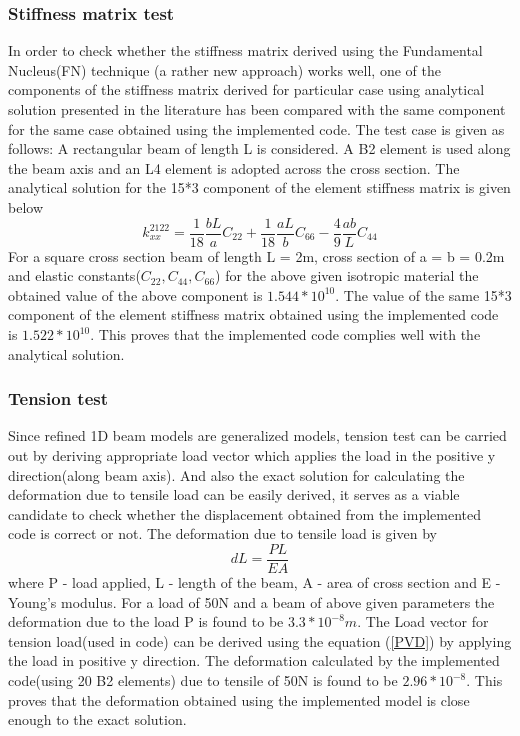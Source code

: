 \documentclass[a4paper,12pt]{article}
\begin{document}
\subsubsection*{Stiffness matrix test}
\indent\indent\indent\indent In order to check whether the stiffness matrix derived using the Fundamental Nucleus(FN) technique (a rather new approach) works well, one of the components of the stiffness matrix derived for particular case using analytical solution presented in the literature has been compared with the same component for the same case obtained using the implemented code. The test case is given as follows: A rectangular beam of length L is considered. A B2 element is used along the beam axis and an L4 element is adopted across the cross section. The analytical solution for the 15*3 component of the element stiffness matrix is given below
\begin{equation}
k^{2122}_{xx} = \frac{1}{18} \frac{b L}{a} C_{22} + \frac{1}{18} \frac{a L}{b} C_{66} - \frac{4}{9} \frac{a b}{L} C_{44}
\end{equation}
For a square cross section beam of length L = 2m, cross section of a = b = 0.2m and elastic constants($C_{22},C_{44},C_{66}$) for the above given isotropic material the obtained value of the above component is $1.544*10^{10}$. The value of the same 15*3 component of the element stiffness matrix obtained using the implemented code is $1.522*10^{10}$. This proves that the implemented code complies well with the analytical solution.
\subsubsection*{Tension test}
\indent\indent\indent\indent Since refined 1D beam models are generalized models, tension test can be carried out by deriving appropriate load vector which applies the load in the positive y direction(along beam axis). And also the exact solution for calculating the deformation due to tensile load can be easily derived, it serves as a viable candidate to check whether the displacement obtained from the implemented code is correct or not. The deformation due to tensile load is given by 
\begin{equation}
dL = \frac{P L}{E A}
\label{exactdef}
\end{equation}
where P - load applied, L - length of the beam, A - area of cross section and E - Young's modulus. For a load of 50N and a beam of above given parameters the deformation due to the load P is found to be $3.3*10^{-8}m$. The Load vector for tension load(used in code) can be derived using the equation (\ref{PVD}) by applying the load in positive y direction. The deformation calculated by the implemented code(using 20 B2 elements) due to tensile of 50N is found to be $2.96*10^{-8}$. This proves that the deformation obtained using the implemented model is close enough to the exact solution.
\newpage
\end{document}
